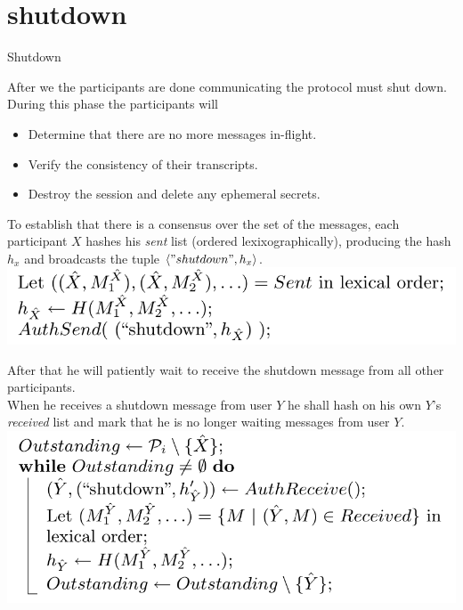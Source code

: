 \section{shutdown}

\begin{frame}
\Huge{\centerline{Shutdown}}
\end{frame}

\begin{frame}
After we the participants are done communicating the protocol must shut down.
\vfill
During this phase the participants will

  \begin{itemize}
    \item Determine that there are no more messages in-flight.
    \item Verify the consistency of their transcripts.
    \item Destroy the session and delete any ephemeral secrets.
  \end{itemize}
\end{frame}


\begin{frame}
To establish that there is a consensus over the set of the messages, each participant $X$ hashes his \emph{sent} list (ordered lexixographically), producing the hash $h_x$ and broadcasts the tuple $\langle "shutdown", h_x \rangle$.\\[0.5cm]

\includegraphics[scale=0.4]{Figures/sent_hash.png}
\end{frame}

\begin{frame}
After that he will patiently wait to receive the shutdown message from all  other participants.\\[0.5cm]

When he receives a shutdown message from user $Y$ he shall hash on his own $Y$'s \emph{received} list  and mark that he is no longer waiting messages from user $Y$.\\[0.5cm]

\includegraphics[scale=0.4]{Figures/received_hashes.png}
\end{frame}

